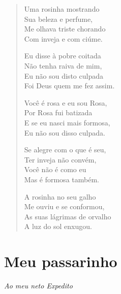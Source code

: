 \begin{verse}
Uma rosinha mostrando\\
Sua beleza e perfume,\\
Me olhava triste chorando\\
Com inveja e com ciúme.

Eu disse à pobre coitada\\
Não tenha raiva de mim,\\
Eu não sou disto culpada\\
Foi Deus quem me fez assim.

Você é rosa e eu sou Rosa,\\
Por Rosa fui batizada\\
E se eu nasci mais formosa,\\
Eu não sou disso culpada.

Se alegre com o que é seu,\\
Ter inveja não convém,\\
Você não é como eu\\
Mas é formosa também.

A rosinha no seu galho\\
Me ouviu e se conformou,\\
As suas lágrimas de orvalho\\
A luz do sol enxugou.
\end{verse}

\chapter{Meu passarinho}

\begin{flushright}
\emph{Ao meu neto Expedito}
\end{flushright}


